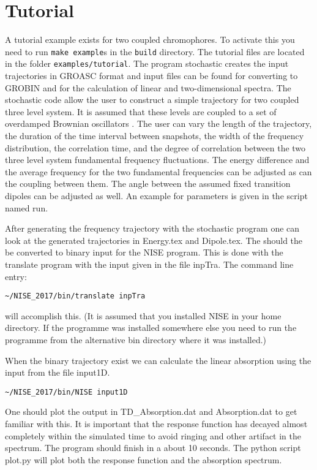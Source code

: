 \chapter{Tutorial}
A tutorial example exists for two coupled chromophores. To activate this you need to run {\tt make example}s in the {\tt build} directory. The tutorial files are located in the folder {\tt examples/tutorial}. The program stochastic creates the input 
trajectories in GROASC format and input files can be found for converting to GROBIN and for the
calculation of linear and two-dimensional spectra. The stochastic code allow the user to construct
a simple trajectory for two coupled three level system. It is assumed that these levels are coupled
to a set of overdamped Brownian oscillators \cite{Mukamel.1995.B01}.
The user can vary the length of the trajectory, the duration of the time interval between snapshots, the 
width of the frequency distribution, the correlation time, and the degree of correlation between the
two three level system fundamental frequency fluctuations. The energy difference and the average frequency for the two fundamental frequencies can be adjusted as can the coupling between them.
The angle between the assumed fixed transition dipoles can be adjusted as well. An example for
parameters is given in the script named run. 

After generating the frequency trajectory with the stochastic program one can look at the generated
trajectories in Energy.tex and Dipole.tex. The should the be converted to binary input for the NISE
program. This is done with the translate program with the input given in the file inpTra.
The command line entry:
\begin{verbatim}
~/NISE_2017/bin/translate inpTra
\end{verbatim}
will accomplish this. (It is assumed that you installed NISE in your home directory. If the programme was installed somewhere else you need to run the programme from the alternative bin directory where it was installed.)

When the binary trajectory exist we can calculate the linear absorption using the input from the file input1D.
\begin{verbatim}
~/NISE_2017/bin/NISE input1D
\end{verbatim}
One should plot the output in TD\_Absorption.dat and Absorption.dat to get familiar with this. It is 
important that the response function has decayed almost completely within the simulated 
time to avoid ringing and other artifact in the spectrum. The program should finish in a 
about 10 seconds. The python script plot.py will plot both the response function and the absorption spectrum.

